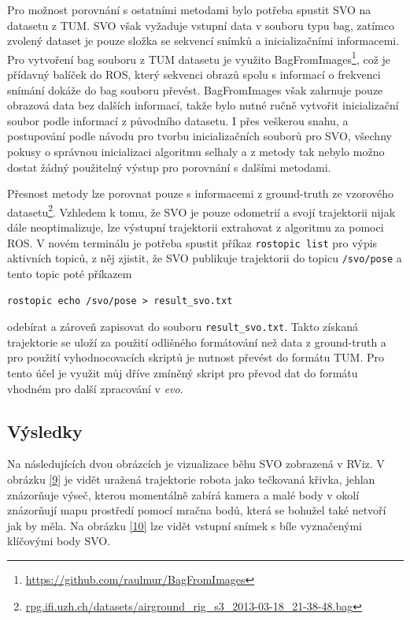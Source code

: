 \documentclass[12pt,a4paper]{report}
\begin{document}
Pro možnost porovnání s ostatními metodami bylo potřeba spustit SVO na datasetu z TUM. SVO však vyžaduje vstupní data v souboru typu bag, zatímco zvolený dataset je pouze složka se sekvencí snímků a inicializačními informacemi. Pro vytvoření bag souboru z TUM datasetu je využito BagFromImages\footnote{\url{https://github.com/raulmur/BagFromImages}}, což je přídavný balíček do ROS, který sekvenci obrazů spolu s informací o frekvenci snímání dokáže do bag souboru převést. BagFromImages však zahrnuje pouze obrazová data bez dalších informací, takže bylo nutné ručně vytvořit inicializační soubor podle informací z původního datasetu. I přes veškerou snahu, a postupování podle návodu pro tvorbu inicializačních souborů pro SVO, všechny pokusy o správnou inicializaci algoritmu selhaly a z metody tak nebylo možno dostat žádný použitelný výstup pro porovnání s dalšími metodami.

Přesnost metody lze porovnat pouze s informacemi z ground-truth ze vzorového datasetu\footnote{\url{rpg.ifi.uzh.ch/datasets/airground_rig_s3_2013-03-18_21-38-48.bag}}. Vzhledem k tomu, že SVO je pouze odometrií a svojí trajektorii nijak dále neoptimalizuje, lze výstupní trajektorii extrahovat z algoritmu za pomoci ROS. V novém terminálu je potřeba spustit příkaz \texttt{rostopic list} pro výpis aktivních topiců, z něj zjistit, že SVO publikuje trajektorii do topicu \texttt{/svo/pose} a tento topic poté příkazem 
\begin{verbatim}
rostopic echo /svo/pose > result_svo.txt
\end{verbatim}
 odebírat a zároveň zapisovat do souboru \texttt{result\_svo.txt}. Takto získaná trajektorie se uloží za použití odlišného formátování než data z ground-truth a pro použití vyhodnocovacích skriptů je nutnost převést do formátu TUM. Pro tento účel je využit můj dříve zmíněný skript pro převod dat do formátu vhodném pro další zpracování v \textit{evo}.

\subsection*{Výsledky} 
Na následujících dvou obrázcích je vizualizace běhu SVO zobrazená v RViz. V obrázku \ref{9} je vidět uražená trajektorie robota jako tečkovaná křivka, jehlan znázorňuje výseč, kterou momentálně zabírá kamera a malé body v okolí znázorňují mapu prostředí pomocí mračna bodů, která se bohužel také netvoří jak by měla. Na obrázku \ref{10} lze vidět vstupní snímek s bíle vyznačenými klíčovými body SVO.
 
\end{document}
